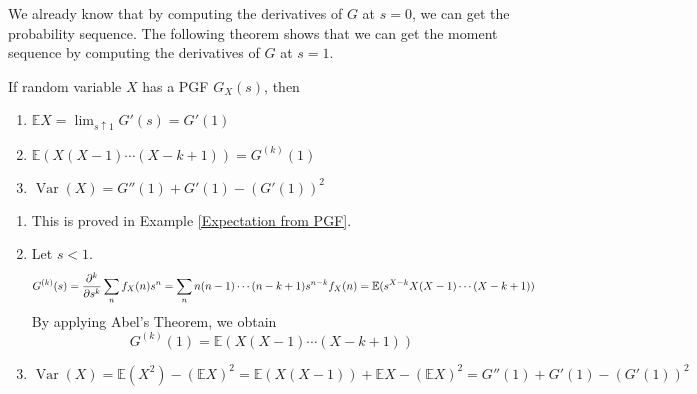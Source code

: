 \documentclass{huhtakm-template-book}
\newcommand{\expect}{\mathbb{E}}
\DeclareMathOperator{\Var}{Var}
\begin{document}
    We already know that by computing the derivatives of $G$ at $s=0$, we can get the probability sequence. The following theorem shows that we can get the moment sequence by computing the derivatives of $G$ at $s=1$.
    \begin{thm}
        If random variable $X$ has a PGF $G_{X}(s)$, then
        \begin{enumerate}
            \item $\expect X=\lim_{s\uparrow 1}G'(s)=G'(1)$
            \item $\expect(X(X-1)\cdots(X-k+1))=G^{(k)}(1)$
            \item $\Var(X)=G''(1)+G'(1)-(G'(1))^{2}$
        \end{enumerate}
    \end{thm}
    \begin{proofing}
        \begin{enumerate}
            \item This is proved in Example \ref{Expectation from PGF}.
            \item Let $s<1$.
            \begin{equation*}
                G^{(k)}(s)=\pdv*[order={k}]{\sum_{n}f_{X}(n)s^{n}}{s}=\sum_{n}n(n-1)\cdots(n-k+1)s^{n-k}f_{X}(n)=\expect(s^{X-k}X(X-1)\cdots(X-k+1))
            \end{equation*}
            By applying Abel's Theorem, we obtain
            \begin{equation*}
                G^{(k)}(1)=\expect(X(X-1)\cdots(X-k+1))
            \end{equation*}
            \item 
            \begin{equation*}
                \Var(X)=\expect(X^{2})-(\expect X)^{2}=\expect(X(X-1))+\expect X-(\expect X)^{2}=G''(1)+G'(1)-(G'(1))^{2}
            \end{equation*}
        \end{enumerate}
    \end{proofing}
\end{document}
